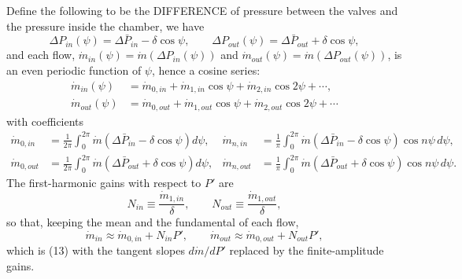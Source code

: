 \documentclass[11pt]{article}
\begin{document}
Define the following to be the DIFFERENCE of pressure between the valves and the pressure inside the chamber, we have
\[
\Delta P_{in}(\psi) = \Delta\bar P_{in} - \delta\cos\psi, \qquad \Delta P_{out}(\psi) = \Delta\bar P_{out} + \delta\cos\psi,
\]
and each flow, $\dot m_{in}(\psi) = \dot m(\Delta P_{in}(\psi))$ and $\dot m_{out}(\psi) = \dot m(\Delta P_{out}(\psi))$, is an even periodic function of $\psi$, hence a cosine series:
\begin{align*}
\dot m_{in}(\psi) &= \dot m_{0,in} + \dot m_{1,in}\cos\psi + \dot m_{2,in}\cos 2\psi + \cdots, \\
\dot m_{out}(\psi) &= \dot m_{0,out} + \dot m_{1,out}\cos\psi + \dot m_{2,out}\cos 2\psi + \cdots
\end{align*}
with coefficients
\begin{equation}
\begin{aligned}
\dot m_{0,in} &= \frac{1}{2\pi}\int_0^{2\pi}\dot m\left(\Delta\bar P_{in} - \delta\cos\psi\right)d\psi, &
\dot m_{n,in} &= \frac{1}{\pi}\int_0^{2\pi}\dot m\left(\Delta\bar P_{in} - \delta\cos\psi\right)\cos n\psi\,d\psi, \\
\dot m_{0,out} &= \frac{1}{2\pi}\int_0^{2\pi}\dot m\left(\Delta\bar P_{out} + \delta\cos\psi\right)d\psi, &
\dot m_{n,out} &= \frac{1}{\pi}\int_0^{2\pi}\dot m\left(\Delta\bar P_{out} + \delta\cos\psi\right)\cos n\psi\,d\psi .
\end{aligned} \tag{16}
\end{equation}
The first-harmonic gains with respect to $P'$ are
\[
N_{in} \equiv \frac{\dot m_{1,in}}{\delta}, \qquad N_{out} \equiv \frac{\dot m_{1,out}}{\delta},
\]
so that, keeping the mean and the fundamental of each flow,
\[
\dot m_{in} \approx \dot m_{0,in} + N_{in}P', \qquad \dot m_{out} \approx \dot m_{0,out} + N_{out}P',
\]
which is (13) with the tangent slopes $d\dot m/dP'$ replaced by the finite-amplitude gains.
\end{document}
